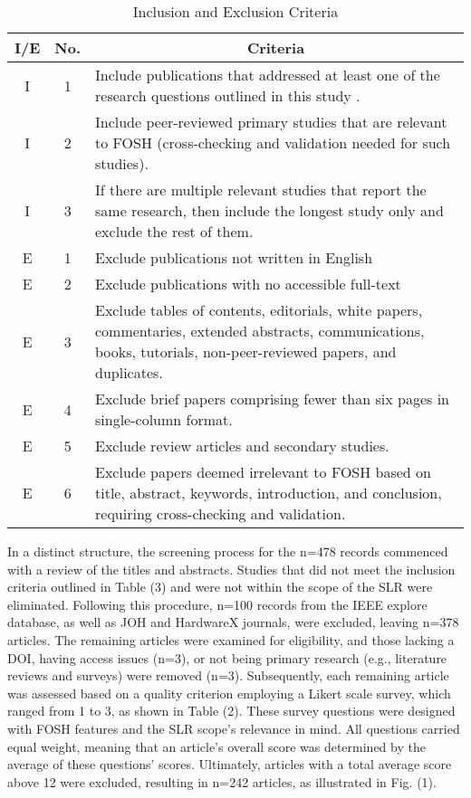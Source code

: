 \begin{table}[htbp]
\centering
\caption{Inclusion and Exclusion Criteria}
\begin{tabular}{|c|c|p{6.5cm}|}
\hline
\textbf{I/E} & \textbf{No.} & \multicolumn{1}{c|}{\textbf{Criteria}} \\
\hline
I & 1 & Include publications that addressed at least one of the research questions outlined in this study . \\
\hline
I & 2 & Include peer-reviewed primary studies that are relevant to FOSH (cross-checking and validation needed for such studies). \\
\hline
I & 3 & If there are multiple relevant studies that report the same research, then include the longest study only and exclude the rest of them. \\
\hline
E & 1 & Exclude publications not written in English \\
\hline
E & 2 & Exclude publications with no accessible full-text\\
\hline
E & 3 & Exclude tables of contents, editorials, white papers, commentaries, extended abstracts, communications, books, tutorials, non-peer-reviewed papers, and duplicates. \\
\hline
E & 4 & Exclude brief papers comprising fewer than six pages in single-column format. \\
\hline
E & 5 & Exclude review articles and secondary studies. \\
\hline
E & 6 & Exclude papers deemed irrelevant to FOSH based on title, abstract, keywords, introduction, and conclusion, requiring cross-checking and validation. \\
\hline
\end{tabular}
\label{tab:criteria}
\end{table}

In a distinct structure, the screening process for the n=478 records commenced with a review of the titles and abstracts. 
Studies that did not meet the inclusion criteria outlined in Table (3) and were not within the scope of the SLR were eliminated. 
Following this procedure, n=100 records from the IEEE explore database, as well as JOH and HardwareX journals, were excluded, leaving n=378 articles. 
The remaining articles were examined for eligibility, and those lacking a DOI, having access issues (n=3), or not being primary research (e.g., literature reviews and surveys) were removed (n=3). 
Subsequently, each remaining article was assessed based on a quality criterion employing a Likert scale survey, which ranged from 1 to 3, as shown in Table (2). 
These survey questions were designed with FOSH features and the SLR scope's relevance in mind. 
All questions carried equal weight, meaning that an article's overall score was determined by the average of these questions' scores. 
Ultimately, articles with a total average score above 12 were excluded, resulting in n=242 articles, as illustrated in Fig. (1).

